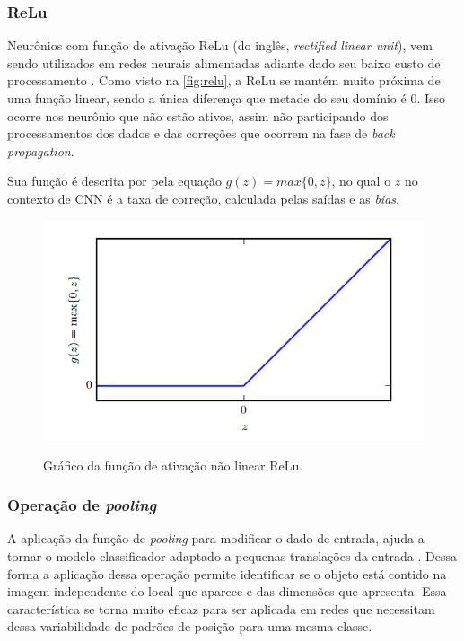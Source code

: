 \subsubsection{ReLu}

Neurônios com função de ativação ReLu (do inglês, \textit{rectified linear unit}), vem sendo utilizados em redes neurais alimentadas adiante dado seu baixo custo de processamento \cite{glorot2011deep}. Como visto na \autoref{fig:relu}, a ReLu se mantém muito próxima de uma função linear, sendo a única diferença que metade do seu domínio é 0. Isso ocorre nos neurônio que não estão ativos, assim não participando dos processamentos dos dados e das correções que ocorrem na fase de \textit{back propagation}.
\par Sua função é descrita por pela equação $g(z)=max\{0,z\}$, no qual o $z$ no contexto de CNN é a taxa de correção, calculada pelas saídas e as \textit{bias}.
\begin{figure}[H]
  \centering
  \caption{Gráfico da função de ativação não linear ReLu.}
  \includegraphics[width=400pt]{dados/figuras/relu}
  \label{fig:relu}
\end{figure}

\subsubsection{Operação de \textit{pooling}}
A aplicação da função de \textit{pooling} para modificar o dado de entrada, ajuda a tornar o modelo classificador adaptado a pequenas translações da entrada \cite{Goodfellow-et-al-2016}. Dessa forma a aplicação dessa operação permite identificar se o objeto está contido na imagem independente do local que aparece e das dimensões que apresenta. Essa característica se torna muito eficaz para ser aplicada em redes que necessitam dessa variabilidade de padrões de posição para uma mesma classe.

